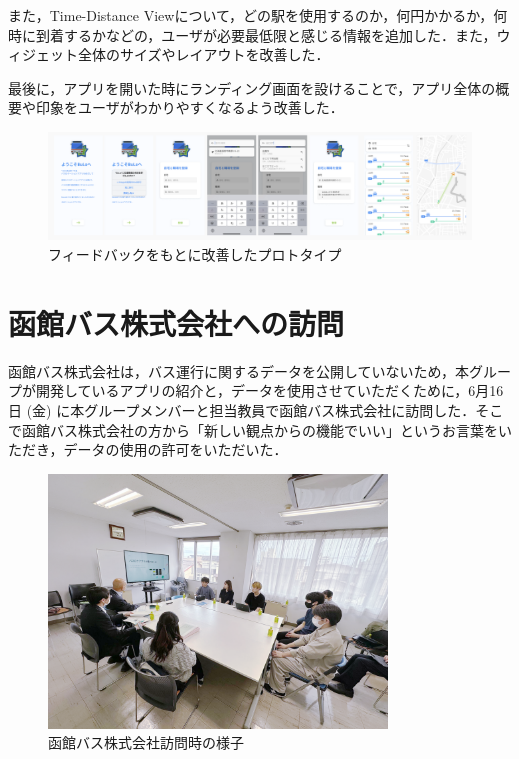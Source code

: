 また，Time-Distance Viewについて，どの駅を使用するのか，何円かかるか，何時に到着するかなどの，ユーザが必要最低限と感じる情報を追加した．また，ウィジェット全体のサイズやレイアウトを改善した．

最後に，アプリを開いた時にランディング画面を設けることで，アプリ全体の概要や印象をユーザがわかりやすくなるよう改善した．

\begin{figure}[htbp]
    \centering
    \includegraphics[width=12cm]{images/prototype_v3.png}
    \caption{フィードバックをもとに改善したプロトタイプ}
    \label{fig:prototype_v3}
\end{figure}

\section{函館バス株式会社への訪問}
函館バス株式会社は，バス運行に関するデータを公開していないため，本グループが開発しているアプリの紹介と，データを使用させていただくために，6月16日 (金) に本グループメンバーと担当教員で函館バス株式会社に訪問した．そこで函館バス株式会社の方から「新しい観点からの機能でいい」というお言葉をいただき，データの使用の許可をいただいた．

\begin{figure}[htbp]
    \centering
    \includegraphics[width=9cm]{images/hakodate_bus.png}
    \caption{函館バス株式会社訪問時の様子}
    \label{fig:hakodate_bus}
\end{figure}

